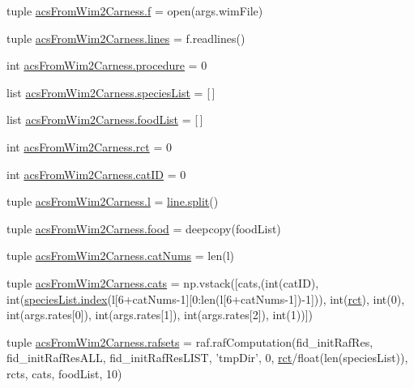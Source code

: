 \begin{DoxyCompactItemize}
\item 
tuple \hyperlink{a00126_ab599c65fad60b9c6ccc220002ce8f89c}{acs\-From\-Wim2\-Carness.\-f} = open(args.\-wim\-File)
\item 
tuple \hyperlink{a00126_a2a83f40b2aa2cbcbd487195fef9af340}{acs\-From\-Wim2\-Carness.\-lines} = f.\-readlines()
\item 
int \hyperlink{a00126_ac84174dad0b933ca88ebdb79cf3497ec}{acs\-From\-Wim2\-Carness.\-procedure} = 0
\item 
list \hyperlink{a00126_aff8baae5d4cd1678204477dd5e620775}{acs\-From\-Wim2\-Carness.\-species\-List} = \mbox{[}$\,$\mbox{]}
\item 
list \hyperlink{a00126_a878da371fd02e9515fe7305e0a57be09}{acs\-From\-Wim2\-Carness.\-food\-List} = \mbox{[}$\,$\mbox{]}
\item 
int \hyperlink{a00126_a61159eb5aec77b97808ce3fb742d8f6d}{acs\-From\-Wim2\-Carness.\-rct} = 0
\item 
int \hyperlink{a00126_a92a1d1f6272fbef428680bed82dd37e7}{acs\-From\-Wim2\-Carness.\-cat\-I\-D} = 0
\item 
tuple \hyperlink{a00126_a0437cd4d2a377ca0e34ab59f4bfd833f}{acs\-From\-Wim2\-Carness.\-l} = \hyperlink{a00059_a4d1aa74fac80ae0275c056575fdb6626}{line.\-split}()
\item 
tuple \hyperlink{a00126_aee9290533a24e96dbde7c8e71055497f}{acs\-From\-Wim2\-Carness.\-food} = deepcopy(food\-List)
\item 
tuple \hyperlink{a00126_a0d474343423a1a87a760dd91411f96b4}{acs\-From\-Wim2\-Carness.\-cat\-Nums} = len(l)
\item 
tuple \hyperlink{a00126_aea4d714ca7ceaba151380b3aed7c34d8}{acs\-From\-Wim2\-Carness.\-cats} = np.\-vstack(\mbox{[}cats,(int(cat\-I\-D), int(\hyperlink{a00102_a0cd6a44ffb07342cbc7e5ac33bfc9495}{species\-List.\-index}(l\mbox{[}6+cat\-Nums-\/1\mbox{]}\mbox{[}0\-:len(l\mbox{[}6+cat\-Nums-\/1\mbox{]})-\/1\mbox{]})), int(\hyperlink{a00028_a188d6e4d5a19aaeb1532fc5b9791afba}{rct}), int(0), int(args.\-rates\mbox{[}0\mbox{]}), int(args.\-rates\mbox{[}1\mbox{]}), int(args.\-rates\mbox{[}2\mbox{]}), int(1))\mbox{]})
\item 
tuple \hyperlink{a00126_a36370edf2a6a4e19f0a99413aac43096}{acs\-From\-Wim2\-Carness.\-rafsets} = raf.\-raf\-Computation(fid\-\_\-init\-Raf\-Res, fid\-\_\-init\-Raf\-Res\-A\-L\-L, fid\-\_\-init\-Raf\-Res\-L\-I\-S\-T, 'tmp\-Dir', 0, \hyperlink{a00028_a188d6e4d5a19aaeb1532fc5b9791afba}{rct}/float(len(species\-List)), rcts, cats, food\-List, 10)
\item 

\end{DoxyCompactItemize}
